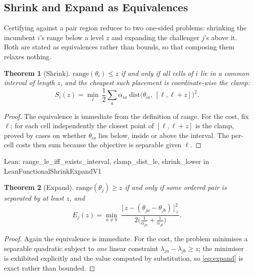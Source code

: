 \documentclass[conference]{IEEEtran}
\newtheorem{theorem}{Theorem}
\theoremstyle{definition}
\newcommand{\lean}[1]{\textsf{\footnotesize #1}}
\newcommand{\leanbox}[1]{%
  \par\vspace{2pt}\noindent
  {\footnotesize\textsf{Lean: #1}}\par\vspace{2pt}}
\begin{document}
\subsection{Shrink and Expand as Equivalences}
\label{sec:shrink}

Certifying against a pair region reduces to two one-sided problems: shrinking the incumbent
$i$'s range below a level $z$ and expanding the challenger $j$'s above it. Both are stated as
equivalences rather than bounds, so that composing them relaxes nothing.

\begin{theorem}[Shrink]
\label{thm:shrink}
$\mathrm{range}(\theta_{i})\le z$ if and only if all cells of $i$ lie in a common interval of
length $z$, and the cheapest such placement is coordinate-wise the clamp:
\begin{equation}
S_{i}(z)=\min_{\ell}\,\frac{1}{2}\sum_{a}\alpha_{ia}\;
\mathrm{dist}\bigl(\theta_{ia},\,[\ell,\ell+z]\bigr)^{2}.
\label{eq:shrink}
\end{equation}
\end{theorem}

\begin{proof}
The equivalence is immediate from the definition of range. For the cost, fix $\ell$; for each
cell independently the closest point of $[\ell,\ell+z]$ is the clamp, proved by cases on
whether $\theta_{ia}$ lies below, inside or above the interval. The per-cell costs then sum
because the objective is separable given $\ell$.
\end{proof}

\leanbox{\lean{range\_le\_iff\_exists\_interval}, \lean{clamp\_dist\_le},
\lean{shrink\_lower} in \lean{LeanFunctionalShrinkExpandV1}}

\begin{theorem}[Expand]
\label{thm:expand}
$\mathrm{range}(\theta_{j})\ge z$ if and only if some \emph{ordered} pair is separated by at
least $z$, and
\begin{equation}
E_{j}(z)=\min_{a\neq b}\;
\frac{\bigl[\,z-(\theta_{ja}-\theta_{jb})\,\bigr]_{+}^{2}}
     {2\bigl(\frac{1}{\alpha_{ja}}+\frac{1}{\alpha_{jb}}\bigr)}.
\label{eq:expand}
\end{equation}
\end{theorem}

\begin{proof}
Again the equivalence is immediate. For the cost, the problem minimises a separable quadratic
subject to \emph{one} linear constraint $\lambda_{ja}-\lambda_{jb}\ge z$; the minimiser is
exhibited explicitly and the value computed by substitution, so \eqref{eq:expand} is exact
rather than bounded.
\end{proof}
\end{document}
